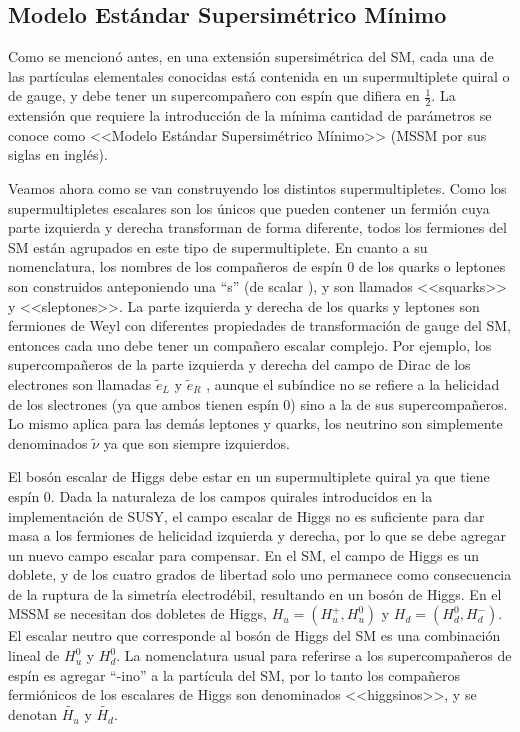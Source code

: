 \subsection{Modelo Estándar Supersimétrico Mínimo}

Como se mencionó antes, en una extensión supersimétrica del SM, cada una de las partículas elementales conocidas está contenida en un supermultiplete quiral o de gauge, y debe tener un supercompañero con espín que difiera en $\frac{1}{2}$. La extensión que requiere la introducción de la mínima cantidad de parámetros se conoce como <<Modelo Estándar Supersimétrico Mínimo>> (MSSM por sus siglas en inglés).

Veamos ahora como se van construyendo los distintos supermultipletes. Como los supermultipletes escalares son los únicos que pueden contener un fermión cuya parte izquierda y derecha transforman de forma diferente, todos los fermiones del SM están agrupados en este tipo de supermultiplete. En cuanto a su nomenclatura, los nombres de los compañeros de espín 0 de los quarks o leptones son construidos anteponiendo una “s” (de scalar ), y son llamados <<squarks>> y <<sleptones>>. La parte izquierda y derecha de los quarks y leptones son fermiones de Weyl con diferentes propiedades de transformación de gauge del SM, entonces cada uno debe tener un compañero escalar complejo. Por ejemplo, los supercompañeros de la parte izquierda y derecha del campo de Dirac de los electrones son llamadas $\tilde{e}_{L}$ y $\tilde{e}_{R}$ , aunque el subíndice no se refiere a la helicidad de los slectrones (ya que ambos tienen espín 0) sino a la de sus supercompañeros. Lo mismo aplica para las demás leptones y quarks, los neutrino son simplemente denominados $\tilde{\nu}$ ya que son siempre izquierdos.

El bosón escalar de Higgs debe estar en un supermultiplete quiral ya que tiene espín 0. Dada la naturaleza de los campos quirales introducidos en la implementación de SUSY, el campo escalar de Higgs no es suficiente para dar masa a los fermiones de helicidad izquierda y derecha, por lo que se debe agregar un nuevo campo escalar para compensar. En el SM, el campo de Higgs es un doblete, y de los cuatro grados de libertad solo uno permanece como consecuencia de la ruptura de la simetría electrodébil, resultando en un bosón de Higgs. En el MSSM se necesitan dos dobletes de Higgs, $H_{u}=(H^{+}_{u},H^{0}_{u})$ y $H_{d}=(H^{0}_{d},H^{-}_{d})$. El escalar neutro que corresponde al bosón de Higgs del SM es una combinación lineal de $H^{0}_{u}$ y $H^{0}_{d}$. La nomenclatura usual para referirse a los supercompañeros de espín  es agregar “-ino” a la partícula del SM, por lo tanto los compañeros fermiónicos de los escalares de Higgs son denominados <<higgsinos>>, y se denotan $\widetilde{H_{u}}$ y $\widetilde{H_{d}}$.


